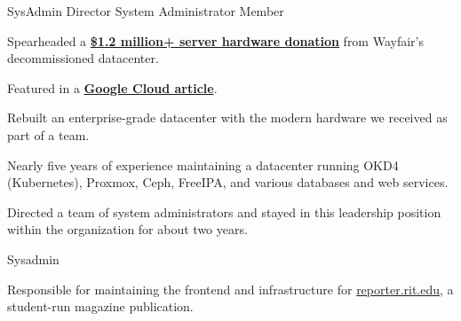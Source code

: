 \vspace{1.5pt} %


\cvtag{\LaTeX}

\smallskip


{
  {SysAdmin Director}    \hfill{}\newline
  {System Administrator} \hfill{}\newline
  {Member}               \hfill{}\newline
}
{
  \item{Spearheaded a \href{https://www.rit.edu/news/wayfair-gifts-850000-servers-rits-computer-science-house}{\textbf{\$1.2 million+ server hardware donation}} from Wayfair's decommissioned datacenter.}
  \item{Featured in a \href{https://cloud.google.com/blog/transform/wayfair-server-donation-mass-open-cloud-rit-student-innovation-johonnot}{\textbf{Google Cloud article}}.}
  \item{Rebuilt an enterprise-grade datacenter with the modern hardware we received as part of a team.}
  \item{Nearly five years of experience maintaining a datacenter running OKD4 (Kubernetes), Proxmox, Ceph, FreeIPA, and various databases and web services.}
  \item{Directed a team of system administrators and stayed in this leadership position within the organization for about two years.}
}

{
  {Sysadmin} \hfill{}\newline
}
{
  \item{Responsible for maintaining the frontend and infrastructure for \href{https://reporter.rit.edu}{reporter.rit.edu}, a student-run magazine publication.}
}

